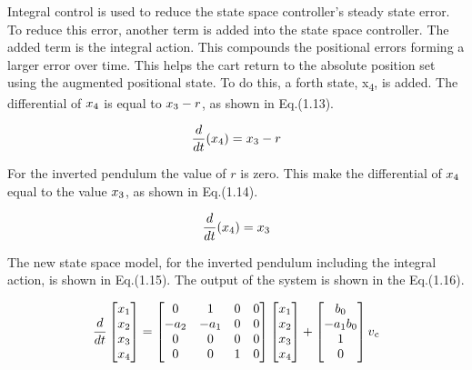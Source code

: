 \documentclass[11pt]{report}
\begin{document}
Integral control is used to reduce the state space controller's steady state error. To reduce this error, another term is added into the state space controller. The added term is the integral action. This compounds the positional errors forming a larger error over time. This helps the cart return to the absolute position set using the augmented positional state. To do this, a forth state, x\textsubscript{4}, is added. The differential of $x\textsubscript{4}$ is equal to $x\textsubscript{3} - r$, as shown in Eq.(1.13). 

\begin{equation}
\frac{d}{dt}(x\textsubscript{4}) = x\textsubscript{3}-r
\end{equation}

For the inverted pendulum the value of $r$ is zero. This make the differential of $x\textsubscript{4}$ equal to the value $x\textsubscript{3}$, as shown in Eq.(1.14).

 \begin{equation}
\frac{d}{dt}(x\textsubscript{4}) = x\textsubscript{3}
\end{equation}

The new state space model, for the inverted pendulum including the integral action, is shown in Eq.(1.15). The output of the system is shown in the Eq.(1.16).

\begin{equation}
\frac{d}{dt}
\begin{bmatrix}
x\textsubscript{1}\\
x\textsubscript{2}\\
x\textsubscript{3}\\
x\textsubscript{4}\\
\end{bmatrix}
=
\begin{bmatrix}
0 & 1 & 0 & 0\\
-a\textsubscript{2} & -a\textsubscript{1} & 0 & 0\\
0 & 0 & 0 & 0\\
0 & 0 & 1 & 0\\
\end{bmatrix}
\begin{bmatrix}
x\textsubscript{1}\\
x\textsubscript{2}\\
x\textsubscript{3}\\
x\textsubscript{4}\\
\end{bmatrix}
+
\begin{bmatrix}
b\textsubscript{0}\\
-a\textsubscript{1}b\textsubscript{0}\\
1\\
0\\
\end{bmatrix}
v\textsubscript{c}
\end{equation}
\end{document}
